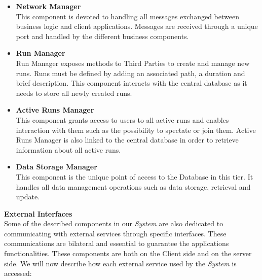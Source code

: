 \documentclass[titlepage]{article}
\begin{document}
	\begin{itemize}
		\item {\bf Network Manager }\\
		This component is devoted to handling all messages exchanged between business logic and client applications. Messages are received through a unique port and handled by the different business components.
		\item {\bf Run Manager }\\
		Run Manager exposes methods to Third Parties  to create and manage new runs. Runs must be defined by adding an associated path, a duration and brief description. This component interacts with the central database as it needs to store all newly created runs.
		\item {\bf Active Runs Manager }\\
		This component grants access to users to all active runs and enables interaction with them such as the possibility to spectate or join them. Active Runs Manager is also linked to the central database in order to retrieve information about all active runs.
		\item {\bf Data Storage Manager }\\
		This component is the unique point of access to the Database in this tier. It handles all data management operations such as data storage, retrieval and update.\\
	\end{itemize}
	{\bf External Interfaces }\\ 
	Some of the described components in our {\it System} are also dedicated to communicating with external services through specific interfaces. These communications are bilateral and essential to guarantee the application\textsc{}s functionalities. These components are both on the Client side and on the server side. We will now describe how each external service used by the {\it System} is accessed:
\end{document}
